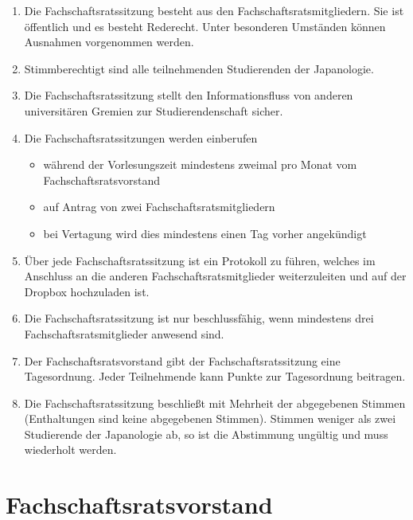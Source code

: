 \documentclass[12pt]{scrartcl}
\begin{document}
\begin{enumerate}
	\item Die Fachschaftsratssitzung besteht aus den Fachschaftsratsmitgliedern. Sie ist öffentlich und es besteht Rederecht. Unter besonderen Umständen können Ausnahmen vorgenommen werden.
	\item Stimmberechtigt sind alle teilnehmenden Studierenden der Japanologie.
	\item Die Fachschaftsratssitzung stellt den Informationsfluss von anderen universitären Gremien zur Studierendenschaft sicher.
	\item Die Fachschaftsratssitzungen werden einberufen
	\begin{itemize}
		\item während der Vorlesungszeit mindestens zweimal pro Monat vom Fachschaftsratsvorstand
		\item auf Antrag von zwei Fachschaftsratsmitgliedern
		\item bei Vertagung wird dies mindestens einen Tag vorher angekündigt
	\end{itemize}
	\item Über jede Fachschaftsratssitzung ist ein Protokoll zu führen, welches im Anschluss an die anderen Fachschaftsratsmitglieder weiterzuleiten und auf der Dropbox hochzuladen ist.
	\item Die Fachschaftsratssitzung ist nur beschlussfähig, wenn mindestens drei Fachschaftsratsmitglieder anwesend sind.
	\item Der Fachschaftsratsvorstand gibt der Fachschaftsratssitzung eine Tagesordnung. Jeder Teilnehmende kann Punkte zur Tagesordnung beitragen.
	\item Die Fachschaftsratssitzung beschließt mit Mehrheit der abgegebenen Stimmen (Enthaltungen sind keine abgegebenen Stimmen). Stimmen weniger als zwei Studierende der Japanologie ab, so ist die Abstimmung ungültig und muss wiederholt werden. 
\end{enumerate}

\section{Fachschaftsratsvorstand}
\end{document}
